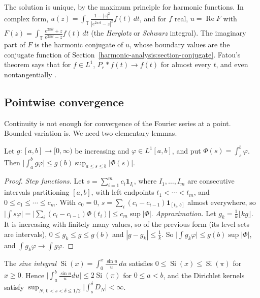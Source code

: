 \begin{remark}\label{harmonic-analysis:remark-poisson}
The solution is unique, by the maximum principle for harmonic functions. In complex form, $u(z) = \int_\mathbb{T}\frac{1 - |z|^2}{|e^{2\pi it} - z|^2}f(t)\,dt$, and for $f$ real, $u = \operatorname{Re}F$ with
$F(z) = \int_\mathbb{T}\frac{e^{2\pi it} + z}{e^{2\pi it} - z}f(t)\,dt$ (the \emph{Herglotz} or \emph{Schwarz} integral). The imaginary part of $F$ is the harmonic conjugate of $u$, whose boundary values are the conjugate function of
Section~\ref{harmonic-analysis:section-conjugate}. Fatou's theorem says that for $f \in L^1$, $P_r * f(t) \to f(t)$ for almost every $t$, and even nontangentially \cite{katznelson-harmonic}.
\end{remark}

\subsection{Pointwise convergence}\label{harmonic-analysis:subsection-pointwise}

Continuity is not enough for convergence of the Fourier series at a point. Bounded variation is. We need two elementary lemmas.

\begin{lemma}\label{harmonic-analysis:lemma-second-mean-value}
Let $g \colon [a, b] \to [0, \infty)$ be increasing and $\varphi \in L^1[a, b]$, and put $\Phi(s) = \int_s^b\varphi$. Then $\bigl|\int_a^bg\varphi\bigr| \leq g(b)\sup_{a \leq s \leq b}|\Phi(s)|$.
\end{lemma}

\begin{proof}
\emph{Step functions.} Let $s = \sum_{i=1}^mc_i\mathbf{1}_{I_i}$, where $I_1, \ldots, I_m$ are consecutive intervals partitioning $[a, b]$, with left endpoints $t_1 < \cdots < t_m$, and $0 \leq c_1 \leq \cdots \leq c_m$. With $c_0 = 0$,
$s = \sum_i(c_i - c_{i-1})\mathbf{1}_{[t_i, b]}$ almost everywhere, so $\bigl|\int s\varphi\bigr| = \bigl|\sum_i(c_i - c_{i-1})\Phi(t_i)\bigr| \leq c_m\sup|\Phi|$.
\emph{Approximation.} Let $g_k = \frac1k\lfloor kg\rfloor$. It is increasing with finitely many values, so of the previous form (its level sets are intervals), $0 \leq g_k \leq g \leq g(b)$ and $|g - g_k| \leq \frac1k$. So
$\bigl|\int g_k\varphi\bigr| \leq g(b)\sup|\Phi|$, and $\int g_k\varphi \to \int g\varphi$.
\end{proof}

\begin{lemma}\label{harmonic-analysis:lemma-sine-integral}
The \emph{sine integral} $\operatorname{Si}(x) = \int_0^x\frac{\sin u}{u}\,du$ satisfies $0 \leq \operatorname{Si}(x) \leq \operatorname{Si}(\pi)$ for $x \geq 0$. Hence $\bigl|\int_a^b\frac{\sin u}{u}du\bigr| \leq 2\operatorname{Si}(\pi)$ for
$0 \leq a < b$, and the Dirichlet kernels satisfy $\sup_{N,\,0 < s < \delta \leq 1/2}\bigl|\int_s^\delta D_N\bigr| < \infty$.
\end{lemma}

